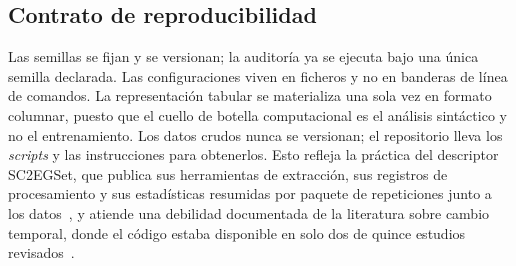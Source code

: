 \documentclass[conference]{IEEEtran}
\begin{document}
\subsection{Contrato de reproducibilidad}
\label{subsec:reproducibility}
Las semillas se fijan y se versionan; la auditor\'ia ya se ejecuta bajo una
\'unica semilla declarada. Las configuraciones viven en ficheros y no en
banderas de l\'inea de comandos. La representaci\'on tabular se materializa
una sola vez en formato columnar, puesto que el cuello de botella
computacional es el an\'alisis sint\'actico y no el entrenamiento. Los datos
crudos nunca se versionan; el repositorio lleva los \emph{scripts} y las
instrucciones para obtenerlos. Esto refleja la pr\'actica del descriptor
SC2EGSet, que publica sus herramientas de extracci\'on, sus registros de
procesamiento y sus estad\'isticas resumidas por paquete de repeticiones
junto a los datos~\cite{bialecki_sc2egset_2023}, y atiende una debilidad
documentada de la literatura sobre cambio temporal, donde el c\'odigo estaba
disponible en solo dos de quince estudios
revisados~\cite{guo_temporalshift_2021}.
\end{document}
